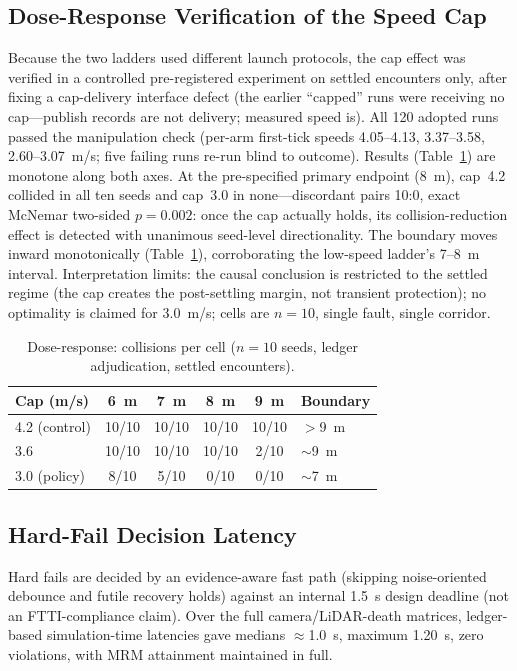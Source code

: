 \documentclass[letterpaper, 10pt, conference]{ieeeconf}
\begin{document}
\subsection{Dose-Response Verification of the Speed Cap}
\label{sec:dose}
Because the two ladders used different launch protocols, the cap effect
was verified in a controlled pre-registered experiment on settled
encounters only, after fixing a cap-delivery interface defect (the earlier
``capped'' runs were receiving no cap---publish records are not delivery;
measured speed is). All 120 adopted runs passed the manipulation check
(per-arm first-tick speeds 4.05--4.13, 3.37--3.58, 2.60--3.07~m/s; five
failing runs re-run blind to outcome). Results (Table~\ref{tab:dose}) are monotone along both axes.
At the pre-specified primary endpoint (8~m), cap~4.2 collided in all ten
seeds and cap~3.0 in none---discordant pairs 10:0, exact McNemar two-sided
$p=0.002$: once the cap actually holds, its collision-reduction effect is
detected with unanimous seed-level directionality. The boundary moves
inward monotonically (Table~\ref{tab:dose}), corroborating the low-speed
ladder's 7--8~m interval. Interpretation limits: the causal conclusion is restricted to the
settled regime (the cap creates the post-settling margin, not transient
protection); no optimality is claimed for 3.0~m/s; cells are $n{=}10$,
single fault, single corridor.

\begin{table}[t]
\caption{Dose-response: collisions per cell ($n{=}10$ seeds, ledger
adjudication, settled encounters).}
\label{tab:dose}
\centering
\footnotesize
\setlength{\tabcolsep}{2pt}
\begin{tabular}{lccccl}
\toprule
Cap (m/s) & 6~m & 7~m & 8~m & 9~m & Boundary \\
\midrule
4.2 (control) & 10/10 & 10/10 & 10/10 & 10/10 & $>$9~m \\
3.6           & 10/10 & 10/10 & 10/10 & 2/10  & $\sim$9~m \\
3.0 (policy)  & 8/10  & 5/10  & 0/10  & 0/10  & $\sim$7~m \\
\bottomrule
\end{tabular}
\vspace{-2mm}
\end{table}

\subsection{Hard-Fail Decision Latency}
Hard fails are decided by an evidence-aware fast path (skipping
noise-oriented debounce and futile recovery holds) against an internal
1.5~s design deadline (not an FTTI-compliance claim). Over the full
camera/LiDAR-death matrices, ledger-based simulation-time latencies gave
medians $\approx$1.0~s, maximum 1.20~s, zero violations, with MRM
attainment maintained in full.
\end{document}
